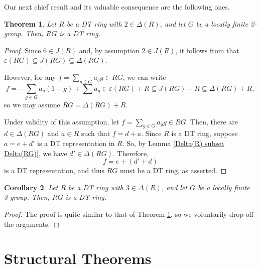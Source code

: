 \documentclass[12pt]{amsart}
\newtheorem{theorem}{Theorem}[section]
\newtheorem{corollary}[theorem]{Corollary}
\theoremstyle{definition}
\begin{document}
Our next chief result and its valuable consequence are the following ones.

\begin{theorem}\label{2 in Delta RG is GDT}
Let $R$ be a DT ring with $2 \in \Delta(R)$, and let $G$ be a locally finite 2-group. Then, $RG$ is a DT ring.
\end{theorem}

\begin{proof}
Since $6 \in J(R)$ and, by assumption $2 \in J(R)$, it follows from \cite[Lemma 2]{zhoucl} that $\varepsilon(RG) \subseteq J(RG) \subseteq \Delta(RG)$.

However, for any $f = \sum_{g \in G} a_g g \in RG$, we can write
\[
f = -\sum_{g \in G} a_g(1-g) + \sum a_g \in \varepsilon(RG) + R \subseteq J(RG) + R \subseteq \Delta(RG) + R,
\]
so we may assume $RG = \Delta(RG) + R$.

Under validity of this assumption, let $f = \sum_{g \in G} a_g g \in RG$. Then, there are $d \in \Delta(RG)$ and $a \in R$ such that $f = d + a$. Since $R$ is a DT ring, suppose $a = e + d'$ is a DT representation in $R$. So, by Lemma \ref{Delta(R) subset Delta(RG)}, we have $d' \in \Delta(RG)$. Therefore,
\[
f = e + (d' + d)
\]
is a DT representation, and thus $RG$ must be a DT ring, as asserted.
\end{proof}

\begin{corollary}\label{3 in Delta RG is GDT}
Let $R$ be a DT ring with $3 \in \Delta(R)$, and let $G$ be a locally finite 3-group. Then, $RG$ is a DT ring.
\end{corollary}

\begin{proof}
The proof is quite similar to that of Theorem \ref{2 in Delta RG is GDT}, so we voluntarily drop off the arguments.
\end{proof}



\section{Structural Theorems}
\end{document}
